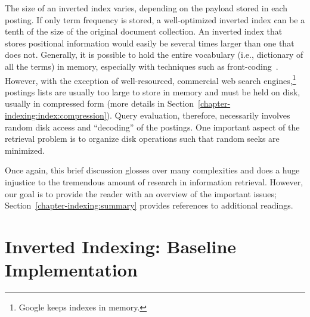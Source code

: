 The size of an inverted index varies, depending on the payload stored
in each posting.  If only term frequency is stored, a well-optimized
inverted index can be a tenth of the size of the original document
collection.  An inverted index that stores positional information
would easily be several times larger than one that does not.
Generally, it is possible to hold the entire vocabulary (i.e.,
dictionary of all the terms) in memory, especially with techniques
such as front-coding~\cite{Witten_etal_1999}.  However, with the
exception of well-resourced, commercial web search
engines,\footnote{Google keeps indexes in memory.}  postings lists are
usually too large to store in memory and must be held on disk, usually
in compressed form (more details in
Section~\ref{chapter-indexing:index:compression}).  Query evaluation,
therefore, necessarily involves random disk access and ``decoding'' of
the postings.  One important aspect of the retrieval problem is to
organize disk operations such that random seeks are minimized.

Once again, this brief discussion glosses over many complexities and
does a huge injustice to the tremendous amount of research in
information retrieval.  However, our goal is to provide the reader
with an overview of the important issues;
Section~\ref{chapter-indexing:summary} provides references to
additional readings.

\section{Inverted Indexing: Baseline Implementation}
\label{chapter-indexing:index:baseline}

